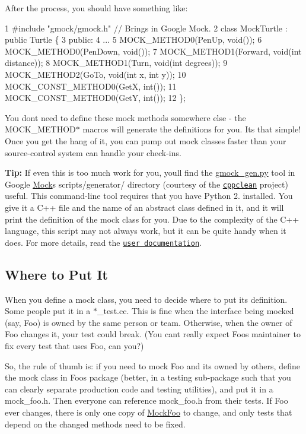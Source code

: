 After the process, you should have something like\+:


\begin{DoxyCode}
1 #include "gmock/gmock.h"  // Brings in Google Mock.
2 class MockTurtle : public Turtle \{
3  public:
4   ...
5   MOCK\_METHOD0(PenUp, void());
6   MOCK\_METHOD0(PenDown, void());
7   MOCK\_METHOD1(Forward, void(int distance));
8   MOCK\_METHOD1(Turn, void(int degrees));
9   MOCK\_METHOD2(GoTo, void(int x, int y));
10   MOCK\_CONST\_METHOD0(GetX, int());
11   MOCK\_CONST\_METHOD0(GetY, int());
12 \};
\end{DoxyCode}


You don\textquotesingle{}t need to define these mock methods somewhere else -\/ the {\ttfamily M\+O\+C\+K\+\_\+\+M\+E\+T\+H\+O\+D$\ast$} macros will generate the definitions for you. It\textquotesingle{}s that simple! Once you get the hang of it, you can pump out mock classes faster than your source-\/control system can handle your check-\/ins.

{\bfseries Tip\+:} If even this is too much work for you, you\textquotesingle{}ll find the {\ttfamily \hyperlink{gmock__gen_8py}{gmock\+\_\+gen.\+py}} tool in Google \hyperlink{class_mock}{Mock}\textquotesingle{}s {\ttfamily scripts/generator/} directory (courtesy of the \href{http://code.google.com/p/cppclean/}{\tt cppclean} project) useful. This command-\/line tool requires that you have Python 2. installed. You give it a C++ file and the name of an abstract class defined in it, and it will print the definition of the mock class for you. Due to the complexity of the C++ language, this script may not always work, but it can be quite handy when it does. For more details, read the \href{../scripts/generator/README}{\tt user documentation}.

\subsection*{Where to Put It}

When you define a mock class, you need to decide where to put its definition. Some people put it in a {\ttfamily $\ast$\+\_\+test.cc}. This is fine when the interface being mocked (say, {\ttfamily Foo}) is owned by the same person or team. Otherwise, when the owner of {\ttfamily Foo} changes it, your test could break. (You can\textquotesingle{}t really expect {\ttfamily Foo}\textquotesingle{}s maintainer to fix every test that uses {\ttfamily Foo}, can you?)

So, the rule of thumb is\+: if you need to mock {\ttfamily Foo} and it\textquotesingle{}s owned by others, define the mock class in {\ttfamily Foo}\textquotesingle{}s package (better, in a {\ttfamily testing} sub-\/package such that you can clearly separate production code and testing utilities), and put it in a {\ttfamily mock\+\_\+foo.\+h}. Then everyone can reference {\ttfamily mock\+\_\+foo.\+h} from their tests. If {\ttfamily Foo} ever changes, there is only one copy of {\ttfamily \hyperlink{class_mock_foo}{Mock\+Foo}} to change, and only tests that depend on the changed methods need to be fixed.

